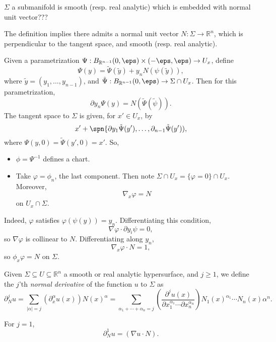 \documentclass[12pt]{article}
\begin{document}
\begin{remark}
	$\Sigma$ a submanifold is smooth (resp. real analytic) which is embedded with normal unit vector???
\end{remark}

The definition implies there admits a normal unit vector $N : \Sigma \to \mathbb{R}^n$, which is perpendicular to the tangent space, and smooth (resp. real analytic).

Given a parametrization $\Psi : B_{\mathbb{R}^{n-1}}(0, \eps) \times (-\eps, \eps) \to U_x$, define
\[
\Psi(y) = \tilde \Psi(\tilde y) + y_n N(\psi(\tilde y)),
\]
where $\tilde y = (y_1, \ldots, y_{n-1})$, and $\tilde \Psi : B_{\mathbb{R}^{n-1}}(0, \eps) \to \Sigma \cap U_x$. Then for this parametrization,
\[
\partial y_n \Psi(y) = N(\tilde \Psi(\tilde \psi)).
\]
The tangent space to $\Sigma$ is given, for $x' \in U_x$, by
\[
x' + \spn \{ \partial y_1 \tilde \Psi(y'), \ldots, \partial_{n-1} \tilde \Psi(y')),
\]
where $\Psi(y, 0) = \tilde \Psi(y', 0) = x'$. So,
\begin{itemize}
	\item $\phi = \Psi^{-1}$ defines a chart.
	\item Take $\varphi = \phi_n$, the last component. Then note $\Sigma \cap U_x = \{\varphi = 0\} \cap U_x$. Moreover,
		\[
		\nabla_x \varphi = N
		\]
		on $U_x \cap \Sigma$.
\end{itemize}

Indeed, $\varphi$ satisfies $\varphi(\psi(y)) = y_n$. Differentiating this condition,
\[
\nabla \varphi \cdot \partial y_i \psi = 0,
\]
so $\nabla \varphi$ is collinear to $N$. Differentiating along $y_n$,
\[
\nabla_x \varphi \cdot N = 1,
\]
so $\phi_x \varphi = N$ on $\Sigma$.

\begin{definition}
	Given $\Sigma \subseteq U \subseteq \mathbb{R}^n$ a smooth or real analytic hypersurface, and $j \geq 1$, we define the $j$'th \emph{normal derivative} of the function $u$ to $\Sigma$ as
	\[
	\partial^j_N u = \sum_{|\alpha| = j} (\partial^\alpha_x u(x)) N(x)^\alpha = \sum_{\alpha_1 + \cdots + \alpha_n = j} \left( \frac{\partial^j u(x)}{\partial x_1^{\alpha_1} \cdots \partial x_n^{\alpha_n}}\right) N_1(x)^{\alpha_1} \cdots N_n(x) \alpha^{n}.
	\]
\end{definition}

\begin{remark}
	For $j = 1$,
	\[
	\partial^1_N u = (\nabla u \cdot N).
	\]
\end{remark}
\end{document}
